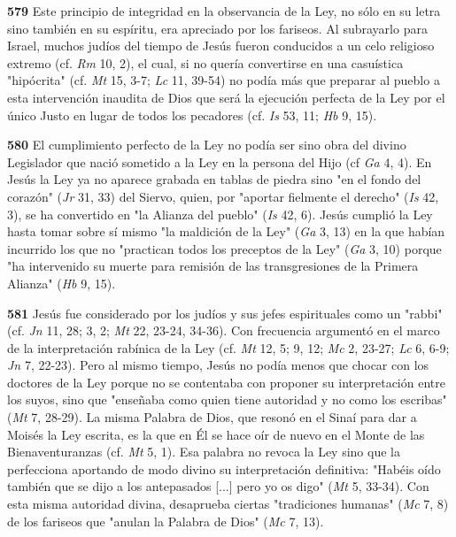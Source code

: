 \documentclass[]{article}
\begin{document}
\textbf{579} Este principio de integridad en la observancia de la Ley,
no sólo en su letra sino también en su espíritu, era apreciado por los
fariseos. Al subrayarlo para Israel, muchos judíos del tiempo de Jesús
fueron conducidos a un celo religioso extremo (cf. \emph{Rm} 10, 2), el
cual, si no quería convertirse en una casuística "hipócrita" (cf.
\emph{Mt} 15, 3-7; \emph{Lc} 11, 39-54) no podía más que preparar al
pueblo a esta intervención inaudita de Dios que será la ejecución
perfecta de la Ley por el único Justo en lugar de todos los pecadores
(cf. \emph{Is} 53, 11; \emph{Hb} 9, 15).

\textbf{580} El cumplimiento perfecto de la Ley no podía ser sino obra
del divino Legislador que nació sometido a la Ley en la persona del Hijo
(cf \emph{Ga} 4, 4). En Jesús la Ley ya no aparece grabada en tablas de
piedra sino "en el fondo del corazón" (\emph{Jr} 31, 33) del Siervo,
quien, por "aportar fielmente el derecho" (\emph{Is} 42, 3), se ha
convertido en "la Alianza del pueblo" (\emph{Is} 42, 6). Jesús cumplió
la Ley hasta tomar sobre sí mismo "la maldición de la Ley" (\emph{Ga} 3,
13) en la que habían incurrido los que no "practican todos los preceptos
de la Ley" (\emph{Ga} 3, 10) porque "ha intervenido su muerte para
remisión de las transgresiones de la Primera Alianza" (\emph{Hb} 9, 15).

\textbf{581} Jesús fue considerado por los judíos y sus jefes
espirituales como un "rabbi" (cf. \emph{Jn} 11, 28; 3, 2; \emph{Mt} 22,
23-24, 34-36). Con frecuencia argumentó en el marco de la interpretación
rabínica de la Ley (cf. \emph{Mt} 12, 5; 9, 12; \emph{Mc} 2, 23-27;
\emph{Lc} 6, 6-9; \emph{Jn} 7, 22-23). Pero al mismo tiempo, Jesús no
podía menos que chocar con los doctores de la Ley porque no se
contentaba con proponer su interpretación entre los suyos, sino que
"enseñaba como quien tiene autoridad y no como los escribas" (\emph{Mt}
7, 28-29). La misma Palabra de Dios, que resonó en el Sinaí para dar a
Moisés la Ley escrita, es la que en Él se hace oír de nuevo en el Monte
de las Bienaventuranzas (cf. \emph{Mt} 5, 1). Esa palabra no revoca la
Ley sino que la perfecciona aportando de modo divino su interpretación
definitiva: "Habéis oído también que se dijo a los antepasados {[}...{]}
pero yo os digo" (\emph{Mt} 5, 33-34). Con esta misma autoridad divina,
desaprueba ciertas "tradiciones humanas" (\emph{Mc} 7, 8) de los
fariseos que "anulan la Palabra de Dios" (\emph{Mc} 7, 13).
\end{document}
